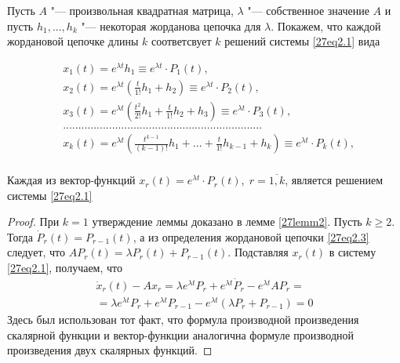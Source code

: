 Пусть $A$ "--- произвольная квадратная матрица, $\lambda$ "--- собственное значение $A$ и пусть $h_1,...,h_k$ "--- некоторая жорданова цепочка для $\lambda$. Покажем, что каждой жордановой цепочке длины $k$ соответсвует $k$ решений системы \eqref{27eq2.1} вида

\begin{equation}\label{27eq2.4}
\begin{aligned}
&x_1(t)=e^{\lambda t}h_1\equiv e^{\lambda t}\cdot P_1(t),\\
&x_2(t)=e^{\lambda t}\left( \frac{t}{1!}h_1+h_2\right)\equiv e^{\lambda t}\cdot P_2(t),\\
&x_3(t)=e^{\lambda t}\left( \frac{t^2}{2!}h_1+\frac{t}{1!}h_2+h_3\right)\equiv e^{\lambda t}\cdot P_3(t),\\
&.................................................................\\
&x_k(t)=e^{\lambda t}\left(\frac{t^{k-1}}{(k-1)!}h_1+...+\frac{t}{1!}h_{k-1}+h_k\right)\equiv e^{\lambda t}\cdot P_k(t),\\
\end{aligned}
\end{equation}

\begin{lemm}\label{27lemm3}
Каждая из вектор-функций $x_r(t)=e^{\lambda t}\cdot P_r(t),\; r=\overline{1,k}$, является решением системы \eqref{27eq2.1}
\end{lemm}

\begin{proof}
При $k=1$ утверждение леммы доказано в лемме \ref{27lemm2}. Пусть $k\geq 2$. Тогда $\dot{P}_r(t)=P_{r-1}(t)$, а из определения жордановой цепочки \eqref{27eq2.3} следует, что $AP_r(t)=\lambda P_r(t)+P_{r-1}(t)$. Подставляя $x_r(t)$ в систему \eqref{27eq2.1}, получаем, что
\begin{multline*}
\dot{x}_r(t)-Ax_r=\lambda e^{\lambda t}P_r+e^{\lambda t}\dot{P}_r-e^{\lambda t}AP_r=\\=\lambda e^{\lambda t} P_r+e^{\lambda t}P_{r-1}-e^{\lambda t}(\lambda P_r+P_{r-1})=0
\end{multline*}
Здесь был использован тот факт, что формула производной произведения скалярной функции и вектор-функции аналогична формуле производной произведения двух скалярных функций.
\end{proof}


